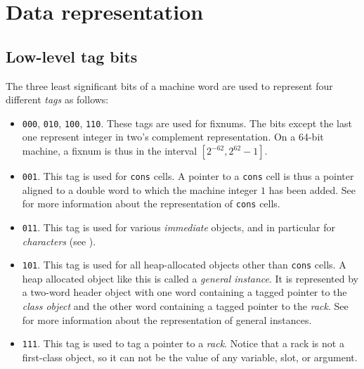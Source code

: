 \chapter{Data representation}
\label{chap-data-representation}

\section{Low-level tag bits}

The three least significant bits of a machine word are used to
represent four different \emph{tags} as follows:

\begin{itemize}
\item \texttt{000}, \texttt{010}, \texttt{100}, \texttt{110}.  These
  tags are used for fixnums.  The bits except the last one represent
  integer in two's complement representation.  On a 64-bit machine, a
  fixnum is thus in the interval $[2^{-62}, 2^{62} - 1]$.
\item \texttt{001}.  This tag is used for \texttt{cons} cells.  A
  pointer to a \texttt{cons} cell is thus a pointer aligned to a
  double word to which the machine integer $1$ has been added.  See
   for more information
  about the representation of \texttt{cons} cells.
\item \texttt{011}.  This tag is used for various \emph{immediate}
  objects, and in particular for \emph{characters} (see 
  ).
\item \texttt{101}.  This tag is used for all heap-allocated
  \commonlisp{} objects other than \texttt{cons} cells.  A heap
  allocated object like this is called a \emph{general instance}.  It
  is represented by a two-word header object with one word containing
  a tagged pointer to the \emph{class object} and the other word
  containing a tagged pointer to the \emph{rack}.  See
   for more
  information about the representation of general instances.
\item \texttt{111}.  This tag is used to tag a pointer to a
  \emph{rack}.  Notice that a rack is not a first-class \commonlisp{}
  object, so it can not be the value of any variable, slot, or
  argument.
\end{itemize}

